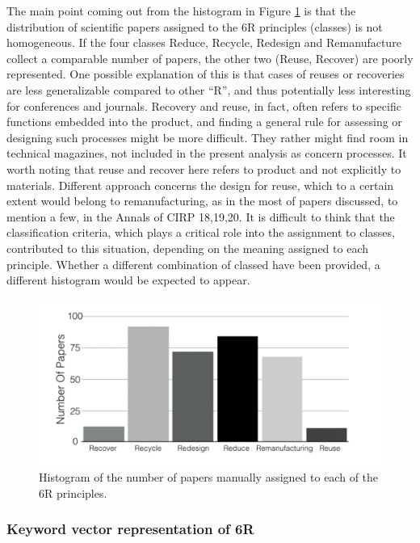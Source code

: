 \documentclass[]{book}
\begin{document}
The main point coming out from the histogram in Figure
\ref{fig:smhistogram} is that the distribution of scientific papers
assigned to the 6R principles (classes) is not homogeneous. If the four
classes Reduce, Recycle, Redesign and Remanufacture collect a comparable
number of papers, the other two (Reuse, Recover) are poorly represented.
One possible explanation of this is that cases of reuses or recoveries
are less generalizable compared to other ``R'', and thus potentially
less interesting for conferences and journals. Recovery and reuse, in
fact, often refers to specific functions embedded into the product, and
finding a general rule for assessing or designing such processes might
be more difficult. They rather might find room in technical magazines,
not included in the present analysis as concern processes. It worth
noting that reuse and recover here refers to product and not explicitly
to materials. Different approach concerns the design for reuse, which to
a certain extent would belong to remanufacturing, as in the most of
papers discussed, to mention a few, in the Annals of CIRP 18,19,20. It
is difficult to think that the classification criteria, which plays a
critical role into the assignment to classes, contributed to this
situation, depending on the meaning assigned to each principle. Whether
a different combination of classed have been provided, a different
histogram would be expected to appear.

\begin{figure}

{\centering \includegraphics[width=0.8\linewidth]{_bookdown_files/figures/sm_histogram} 

}

\caption{Histogram of the number of papers manually assigned to each of the 6R principles.}\label{fig:smhistogram}
\end{figure}

\subsubsection*{Keyword vector representation of
6R}\label{keyword-vector-representation-of-6r}
\end{document}
